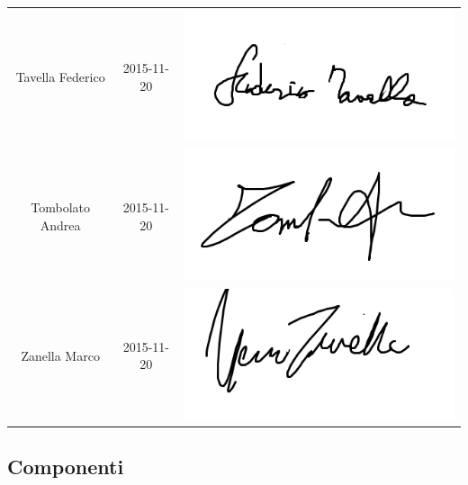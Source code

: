 \documentclass[PianoProgetto.tex]{subfiles}
\begin{document}
\begin{appendices}
\begin{table}[h]
\begin{tabularx}{\textwidth}{C C C}
			Tavella Federico & 2015-11-20 &	 \includegraphics[scale=0.3, trim=0 2.3cm 0 0.3cm]{firme_componenti/ftavella_firma} \\[1.2ex]
			Tombolato Andrea & 2015-11-20 &	 \includegraphics[scale=0.3, trim=0 2.3cm 0 0.3cm]{firme_componenti/atombola_firma} \\[1.2ex]
			Zanella Marco & 2015-11-20 &	\includegraphics[scale=0.3, trim=0 2.3cm 0 0.3cm]{firme_componenti/mzanella_firma} \\[1.2ex]
			\bottomrule
		\end{tabularx}
		
	\end{table}
	
\vfill
	
	\subsection{Componenti}
		\begin{table}[h]
	

\end{table}
\end{appendices}
\end{document}
